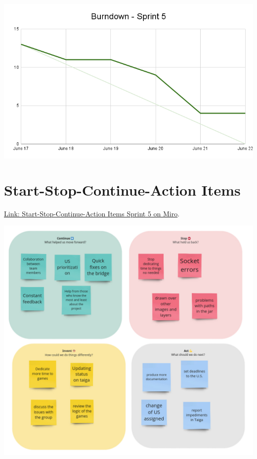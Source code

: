 \documentclass{article}
\begin{document}
\includegraphics[width=\textwidth]{./assets/Burndown-Sprint5.png}

\hypertarget{startstopcontinueactionitems-s3}{
\section{Start-Stop-Continue-Action Items}\label{Start-Stop-Continue-Action Items S6}}
\href{https://miro.com/app/board/uXjVKDO7l8M=/?moveToWidget=3458764590247999187&cot=14}{Link: Start-Stop-Continue-Action Items Sprint 5 on Miro}.

\includegraphics[width=\textwidth]{./assets/Retrospectives-Sprint5.png}
\end{document}
